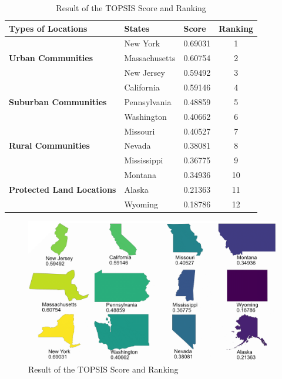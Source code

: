 \begin{table}[H] \centering
    \caption{Result of the TOPSIS Score and Ranking}
    \begin{tabular}{llll}
        \toprule
        Types of Locations & States & Score & Ranking\\ \hline\hline
        \multirow{3}{*}{\textbf{Urban Communities}}& New York & 0.69031 & \multicolumn{1}{c}{1}\\
                            &  Massachusetts & 0.60754 & \multicolumn{1}{c}{2}\\
                            & New Jersey & 0.59492& \multicolumn{1}{c}{3}\\\hline
        \multirow{3}{*}{\textbf{Suburban Communities}} & California & 0.59146 & \multicolumn{1}{c}{4}\\
                            & Pennsylvania & 0.48859 & \multicolumn{1}{c}{5}\\
                           & Washington & 0.40662 & \multicolumn{1}{c}{6}\\\hline
        \multirow{3}{*}{\textbf{Rural Communities}}& Missouri & 0.40527 &\multicolumn{1}{c}{7}\\
                            & Nevada & 0.38081 & \multicolumn{1}{c}{8}\\
                            & Mississippi & 0.36775 & \multicolumn{1}{c}{9}\\\hline
        \multirow{3}{*}{\textbf{Protected Land Locations}}& Montana & 0.34936 & \multicolumn{1}{c}{10}\\
                            & Alaska & 0.21363  & \multicolumn{1}{c}{11}\\
                           & Wyoming & 0.18786 & \multicolumn{1}{c}{12}\\
        \bottomrule
    \end{tabular}
\end{table}

\begin{figure}[H]\centering
    \includegraphics[width=1\textwidth]{figures/result.png}
    \caption{Result of the TOPSIS Score and Ranking} \label{fig:figure5}
\end{figure}